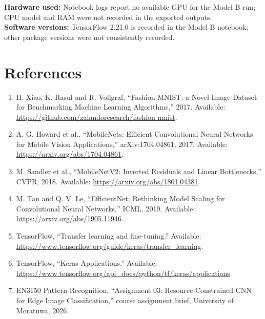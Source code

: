 \documentclass[12pt,a4paper]{article}
\begin{document}
\textbf{Hardware used:} Notebook logs report no available GPU for the Model B run; CPU model and RAM were not recorded in the exported outputs.\\
\textbf{Software versions:} TensorFlow 2.21.0 is recorded in the Model B notebook; other package versions were not consistently recorded.

\newpage
\section{References}
\begin{enumerate}[leftmargin=1.5em]
\item H. Xiao, K. Rasul and R. Vollgraf, ``Fashion-MNIST: a Novel Image Dataset for Benchmarking Machine Learning Algorithms,'' 2017. Available: \url{https://github.com/zalandoresearch/fashion-mnist}.
\item A. G. Howard et al., ``MobileNets: Efficient Convolutional Neural Networks for Mobile Vision Applications,'' arXiv:1704.04861, 2017. Available: \url{https://arxiv.org/abs/1704.04861}.
\item M. Sandler et al., ``MobileNetV2: Inverted Residuals and Linear Bottlenecks,'' CVPR, 2018. Available: \url{https://arxiv.org/abs/1801.04381}.
\item M. Tan and Q. V. Le, ``EfficientNet: Rethinking Model Scaling for Convolutional Neural Networks,'' ICML, 2019. Available: \url{https://arxiv.org/abs/1905.11946}.
\item TensorFlow, ``Transfer learning and fine-tuning.'' Available: \url{https://www.tensorflow.org/guide/keras/transfer_learning}.
\item TensorFlow, ``Keras Applications.'' Available: \url{https://www.tensorflow.org/api_docs/python/tf/keras/applications}.
\item EN3150 Pattern Recognition, ``Assignment 03: Resource-Constrained CNN for Edge Image Classification,'' course assignment brief, University of Moratuwa, 2026.
\end{enumerate}
\end{document}
